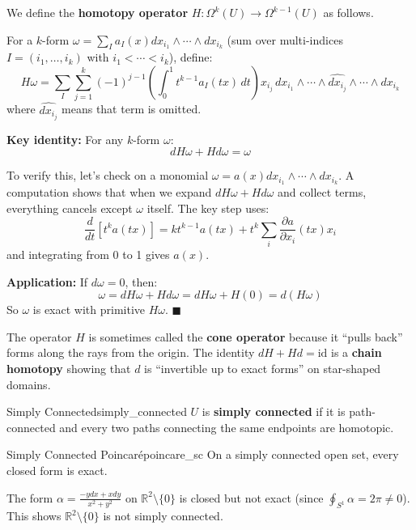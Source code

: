 \documentclass[11pt, letterpaper, openany]{book}
\renewenvironment{proof}[1][\proofname]{%
  \tcolorbox[blanker, breakable, left=1em,
    before skip=1em, after skip=1em,
    borderline west={2pt}{0pt}{MagicTeal!50},
    colback=MagicCream,
    before upper={\textcolor{MagicTeal}{\sffamily\bfseries #1.}\space}
  ]%
}{%
  \hfill\textcolor{MagicTeal}{\ensuremath{\blacksquare}}\endtcolorbox%
}
\begin{document}
\begin{proof}
We define the \textbf{homotopy operator} $H: \Omega^k(U) \to \Omega^{k-1}(U)$ as follows.

For a $k$-form $\omega = \sum_{I} a_I(x) dx_{i_1} \wedge \cdots \wedge dx_{i_k}$ (sum over multi-indices $I = (i_1, \ldots, i_k)$ with $i_1 < \cdots < i_k$), define:
\[H\omega = \sum_I \sum_{j=1}^k (-1)^{j-1} \left( \int_0^1 t^{k-1} a_I(tx) \, dt \right) x_{i_j} \, dx_{i_1} \wedge \cdots \wedge \widehat{dx_{i_j}} \wedge \cdots \wedge dx_{i_k}\]
where $\widehat{dx_{i_j}}$ means that term is omitted.

\textbf{Key identity:} For any $k$-form $\omega$:
\[dH\omega + Hd\omega = \omega\]

To verify this, let's check on a monomial $\omega = a(x) dx_{i_1} \wedge \cdots \wedge dx_{i_k}$. A computation shows that when we expand $dH\omega + Hd\omega$ and collect terms, everything cancels except $\omega$ itself. The key step uses:
\[\frac{d}{dt}[t^k a(tx)] = k t^{k-1} a(tx) + t^k \sum_i \frac{\partial a}{\partial x_i}(tx) x_i\]
and integrating from 0 to 1 gives $a(x)$.

\textbf{Application:} If $d\omega = 0$, then:
\[\omega = dH\omega + Hd\omega = dH\omega + H(0) = d(H\omega)\]
So $\omega$ is exact with primitive $H\omega$.
\end{proof}

\begin{remark}
The operator $H$ is sometimes called the \textbf{cone operator} because it ``pulls back'' forms along the rays from the origin. The identity $dH + Hd = \text{id}$ is a \textbf{chain homotopy} showing that $d$ is ``invertible up to exact forms'' on star-shaped domains.
\end{remark}

\begin{defn}{Simply Connected}{simply_connected}
$U$ is \textbf{simply connected} if it is path-connected and every two paths connecting the same endpoints are homotopic.
\end{defn}

\begin{thm}{Simply Connected Poincaré}{poincare_sc}
On a simply connected open set, every closed form is exact.
\end{thm}

\begin{example}
The form $\alpha = \frac{-y dx + x dy}{x^2 + y^2}$ on $\mathbb{R}^2 \setminus \{0\}$ is closed but not exact (since $\oint_{S^1} \alpha = 2\pi \neq 0$). This shows $\mathbb{R}^2 \setminus \{0\}$ is not simply connected.
\end{example}
\end{document}
